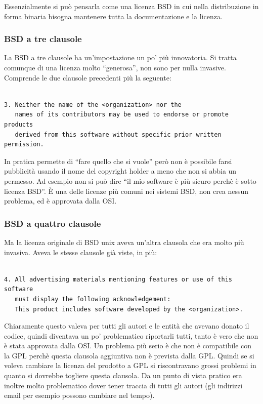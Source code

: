 Essenzialmente si può pensarla come una licenza BSD in cui nella distribuzione in forma binaria bisogna mantenere tutta la documentazione e la licenza. 

 \subsubsection{BSD a tre clausole}

 La BSD a tre clausole ha un'impostazione un po' più innovatoria. Si tratta comunque di una licenza molto ``generosa'', non sono per nulla invasive. Comprende le due clausole precedenti più la seguente:

 \begin{lstlisting}[caption=BSD a tre clausole]

3. Neither the name of the <organization> nor the
   names of its contributors may be used to endorse or promote products
   derived from this software without specific prior written permission.

\end{lstlisting} 

In pratica permette di ``fare quello che si vuole'' però non è possibile farsi pubblicità usando il nome del copyright holder a meno che non si abbia un permesso. Ad esempio non si può dire ``il mio software è più sicuro perchè è sotto licenza BSD''. È una delle licenze più comuni nei sistemi BSD, non crea nessun problema, ed è approvata dalla OSI.

\subsubsection{BSD a quattro clausole}

Ma la licenza originale di BSD unix aveva un'altra clausola che era molto più invasiva. Aveva le stesse clausole già viste, in più:

\begin{lstlisting}[caption=BSD a quattro clausole] 

4. All advertising materials mentioning features or use of this software
   must display the following acknowledgement:
   This product includes software developed by the <organization>.

\end{lstlisting}

Chiaramente questo valeva per tutti gli autori e le entità che avevano donato il codice, quindi diventava un po' problematico riportarli tutti, tanto è vero che non è stata approvata dalla OSI. Un problema più serio è che non è compatibile con la GPL perchè questa clausola aggiuntiva non è prevista dalla GPL. Quindi se si voleva cambiare la licenza del prodotto a GPL si riscontravano grossi problemi in quanto si dovrebbe togliere questa clausola. Da un punto di vista pratico era inoltre molto problematico dover tener traccia di tutti gli autori (gli indirizzi email per esempio possono cambiare nel tempo).

